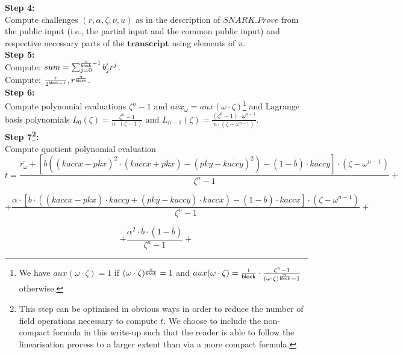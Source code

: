 \noindent \textbf{Step 4:} \\
\noindent Compute challenges $(r, \alpha, \zeta, \nu, u)$ as in the description of $\mathit{SNARK}.\mathit{Prove}$ from the public input (i.e., the partial input and the common public input) 
and respective necessary parts of the $\mathbf{transcript}$ using elements of $\pi$. \\

\noindent \textbf{Step 5:} \\
\noindent Compute: $sum = \sum_{j=0}^{\frac{n}{\mathsf{block}}-1} b'_{j} r^j$. \\

\noindent Compute: $\frac{r}{2^{\mathsf{block} -1}}, r^{\frac{n}{\mathsf{block}}}$. \\

\noindent \textbf{Step 6:} \\
\noindent Compute polynomial evaluations $\zeta^{n} -1$ and $\overline{aux}_{\omega} = aux(\omega \cdot \zeta)$\footnote{We have $aux(\omega \cdot \zeta)= 1$ if $(\omega\cdot \zeta)^{\frac{n}{\mathsf{block}}} =1$ and $aux(\omega \cdot \zeta) = \frac{1}{\mathsf{block}} \cdot \frac{\zeta^n -1}{(\omega\cdot\zeta)^{\frac{n}{\mathsf{block}}} -1}$ otherwise.} and Lagrange basis polynomials 
$L_0(\zeta)= \frac{\zeta^n - 1}{n \cdot (\zeta-1)}$ and $L_{n-1}(\zeta)= \frac{(\zeta^n - 1) \cdot \omega^{n-1}}{n \cdot (\zeta - \omega^{n-1})}$. \\

\noindent \textbf{Step 7\footnote{This step can be optimised in obvious ways in order to reduce the number of field operations necessary to compute $\bar{t}$. We choose to include the non-compact formula in this write-up such that the reader is able to follow the linearisation process to a larger extent than via a more compact formula.}:} \\
\noindent Compute quotient polynomial evaluation $$\bar{t} = 
\frac{\overline{r_{\omega}} + [\bar{b}((\overline{kaccx} - \overline{pkx})^2 \cdot (\overline{kaccx} + \overline{pkx})- (\overline{pky} - \overline{kaccy})^2) - (1-\bar{b})\cdot \overline{kaccy}]\cdot (\zeta - \omega^{n-1})}{\zeta^{n} - 1} +$$

$$+ \frac{\alpha \cdot [\bar{b} \cdot ((\overline{kaccx} - \overline{pkx}) \cdot \overline{kaccy} + (\overline{pky} - \overline{kaccy}) \cdot \overline{kaccx}) - (1 - \bar{b}) \cdot \overline{kaccx}] \cdot (\zeta - \omega^{n-1})}{\zeta^{n} - 1}+$$

$$+\frac{\alpha^2 \cdot \bar{b} \cdot (1 - \bar{b})}{\zeta^{n} - 1} +$$

